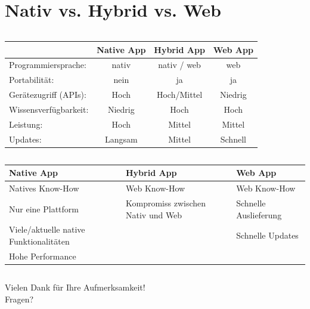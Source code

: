 \documentclass[xcolor=dvipsnames]{beamer}
\begin{document}
\renewcommand{\arraystretch}{1.5}
\section{Nativ vs. Hybrid vs. Web}

\begin{frame}
	\begin{columns}[t,onlytextwidth]
		\begin{tabular}{ l | c | c | c }
			& {\large \textcolor{cordovablue}{Native App}} & {\large \textcolor{cordovablue}{Hybrid App}} & {\large \textcolor{cordovablue}{Web App}} \\
			\hline
			Programmiersprache: & nativ & nativ / web & web \\
			Portabilität: & nein & ja & ja \\
			Gerätezugriff (APIs): & Hoch & Hoch/Mittel & Niedrig \\
			Wissensverfügbarkeit: & Niedrig & Hoch & Hoch \\
			Leistung: & Hoch & Mittel & Mittel \\
			Updates: & Langsam & Mittel & Schnell \\
		\end{tabular}
	\end{columns}
\end{frame}

\begin{frame}
	\begin{columns}[t,onlytextwidth]
		\begin{tabular}{ p{3.2cm} | p{3.2cm} | p{3.2cm} }
			{\large \textcolor{cordovablue}{Native App}} & {\large \textcolor{cordovablue}{Hybrid App}} & {\large \textcolor{cordovablue}{Web App}} \\
			\hline
			Natives Know-How & Web Know-How & Web Know-How \\
			Nur eine Plattform & Kompromiss zwischen Nativ und Web & Schnelle Auslieferung \\
			Viele/aktuelle native Funktionalitäten &  & Schnelle Updates \\
			Hohe Performance &  &  \\
		\end{tabular}
	\end{columns}
\end{frame}

\begin{frame}
	\centering
	\textcolor{cordovablue}{{\LARGE Vielen Dank für Ihre Aufmerksamkeit!\\[6ex] Fragen?}}
\end{frame}
\end{document}
